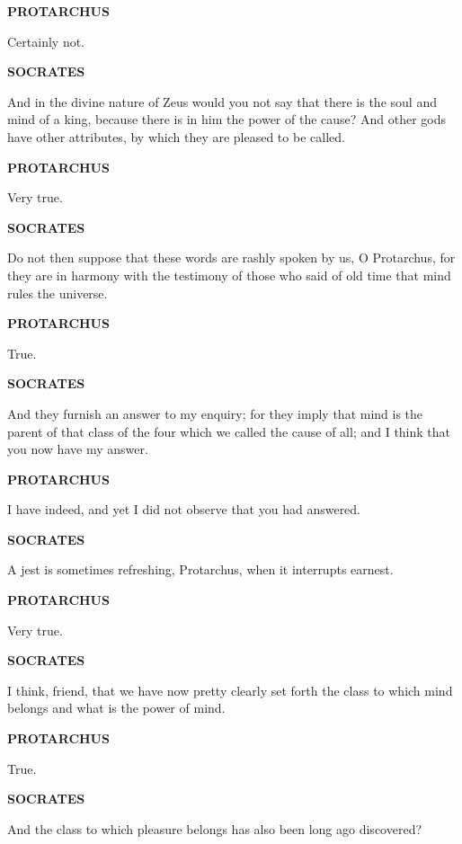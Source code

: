 \documentclass[11pt,letter]{article}
\begin{document}
\par \textbf{PROTARCHUS}
\par   Certainly not.

\par \textbf{SOCRATES}
\par   And in the divine nature of Zeus would you not say that there is the soul and mind of a king, because there is in him the power of the cause? And other gods have other attributes, by which they are pleased to be called.

\par \textbf{PROTARCHUS}
\par   Very true.

\par \textbf{SOCRATES}
\par   Do not then suppose that these words are rashly spoken by us, O Protarchus, for they are in harmony with the testimony of those who said of old time that mind rules the universe.

\par \textbf{PROTARCHUS}
\par   True.

\par \textbf{SOCRATES}
\par   And they furnish an answer to my enquiry; for they imply that mind is the parent of that class of the four which we called the cause of all; and I think that you now have my answer.

\par \textbf{PROTARCHUS}
\par   I have indeed, and yet I did not observe that you had answered.

\par \textbf{SOCRATES}
\par   A jest is sometimes refreshing, Protarchus, when it interrupts earnest.

\par \textbf{PROTARCHUS}
\par   Very true.

\par \textbf{SOCRATES}
\par   I think, friend, that we have now pretty clearly set forth the class to which mind belongs and what is the power of mind.

\par \textbf{PROTARCHUS}
\par   True.

\par \textbf{SOCRATES}
\par   And the class to which pleasure belongs has also been long ago discovered?
\end{document}
